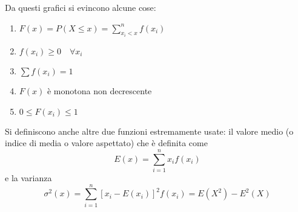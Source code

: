 Da questi grafici si evincono alcune cose:
\begin{enumerate}
  \item $F(x)=P(X\leq x)=\sum\limits^{n}_{x_i<x} f(x_i)$
  \item $f(x_i)\geq0\quad\forall x_i$
  \item $\sum f(x_i)=1$
  \item $F(x)$ è monotona non decrescente
  \item $0\leq F(x_i)\leq1$
\end{enumerate}
Si definiscono anche altre due funzioni estremamente usate: il valore medio (o indice di media o
valore aspettato) che è definita come
\begin{equation*}
  E(x) = \sum\limits^{n}_{i=1} x_if(x_i)
\end{equation*}
e la varianza
\begin{equation*}
  \sigma^2(x) = \sum\limits^{n}_{i=1} [x_i-E(x_i)]^2f(x_i) = E(X^2)-E^2(X)
\end{equation*}
